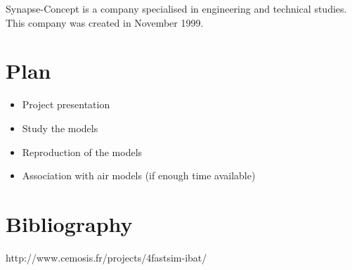\documentclass{article}
\begin{document}
Synapse-Concept is a company specialised in engineering and technical studies. This company was created in November 1999.

\section*{Plan}

\begin{itemize}
    \item Project presentation
    \item Study the models
    \item Reproduction of the models
    \item Association with air models (if enough time available)
\end{itemize}


\section*{Bibliography}
http://www.cemosis.fr/projects/4fastsim-ibat/
\end{document}
